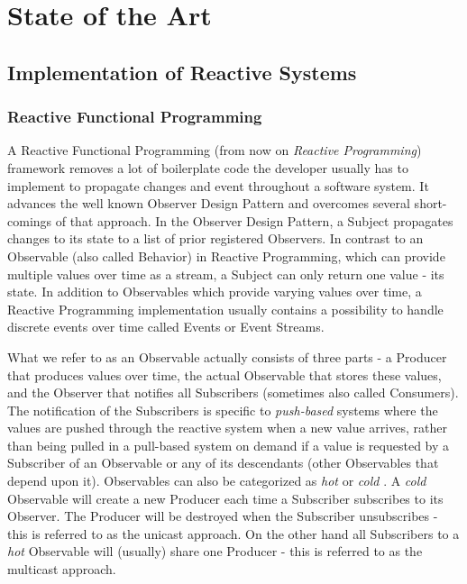 \chapter{State of the Art} \label{chap:State of the Art}

\section{Implementation of Reactive Systems}
	\subsection{Reactive Functional Programming}
	A Reactive Functional Programming \cite{FRP} (from now on \emph{Reactive Programming}) framework removes a lot of boilerplate code the developer usually has to implement to propagate changes and event throughout a software system. It advances the well known Observer Design Pattern and overcomes several short-comings of that approach. In the Observer Design Pattern, a Subject propagates changes to its state to a list of prior registered Observers. In contrast to an Observable (also called Behavior) in Reactive Programming, which can provide multiple values over time as a stream, a Subject can only return one value - its state.
	In addition to Observables which provide varying values over time, a Reactive Programming implementation usually contains a possibility to handle discrete events over time called Events or Event Streams\cite{BaconJS}.
	
	What we refer to as an Observable actually consists of three parts - a Producer that produces values over time, the actual Observable that stores these values, and the Observer that notifies all Subscribers (sometimes also called Consumers). The notification of the Subscribers is specific to \emph{push-based} systems where the values are pushed through the reactive system when a new value arrives, rather than being pulled in a pull-based system on demand if a value is requested by a Subscriber of an Observable or any of its descendants (other Observables that depend upon it).
	Observables can also be categorized as \emph{hot} or \emph{cold} \cite{HotVsCold}. A \emph{cold} Observable will create a new Producer each time a Subscriber subscribes to its Observer. The Producer will be destroyed when the Subscriber unsubscribes - this is referred to as the unicast approach. On the other hand all Subscribers to a \emph{hot} Observable will (usually) share one Producer - this is referred to as the multicast approach.
	
